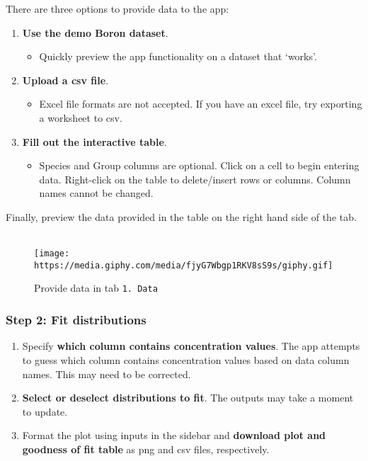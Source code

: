 \documentclass[]{article}
\providecommand{\tightlist}{%
  \setlength{\itemsep}{0pt}\setlength{\parskip}{0pt}}
\begin{document}
There are three options to provide data to the app:

\begin{enumerate}
\def\labelenumi{\arabic{enumi}.}
\tightlist
\item
  \textbf{Use the demo Boron dataset}.

  \begin{itemize}
  \tightlist
  \item
    Quickly preview the app functionality on a dataset that `works'.
  \end{itemize}
\item
  \textbf{Upload a csv file}.

  \begin{itemize}
  \tightlist
  \item
    Excel file formats are not accepted. If you have an excel file, try
    exporting a worksheet to csv.
  \end{itemize}
\item
  \textbf{Fill out the interactive table}.

  \begin{itemize}
  \tightlist
  \item
    Species and Group columns are optional. Click on a cell to begin
    entering data. Right-click on the table to delete/insert rows or
    columns. Column names cannot be changed.
  \end{itemize}
\end{enumerate}

Finally, preview the data provided in the table on the right hand side
of the tab.\\
~\\

\begin{figure}
\centering
\texttt{[image: https://media.giphy.com/media/fjyG7Wbgp1RKV8sS9s/giphy.gif]}
\caption{Provide data in tab \texttt{1.\ Data}}
\end{figure}

\hypertarget{step-2-fit-distributions}{%
\subsubsection{Step 2: Fit
distributions}\label{step-2-fit-distributions}}

\begin{enumerate}
\def\labelenumi{\arabic{enumi}.}
\tightlist
\item
  Specify \textbf{which column contains concentration values}. The app
  attempts to guess which column contains concentration values based on
  data column names. This may need to be corrected.
\item
  \textbf{Select or deselect distributions to fit}. The outputs may take
  a moment to update.
\item
  Format the plot using inputs in the sidebar and \textbf{download plot
  and goodness of fit table} as png and csv files, respectively.\\
\end{enumerate}
\end{document}
